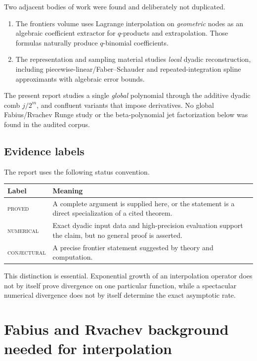 \documentclass[11pt,oneside]{article}
\theoremstyle{definition}
\theoremstyle{remark}
\newcommand{\statusproved}{\textsc{proved}}
\newcommand{\statusnumeric}{\textsc{numerical}}
\newcommand{\statusconj}{\textsc{conjectural}}
\begin{document}
Two adjacent bodies of work were found and deliberately not duplicated.
\begin{enumerate}[leftmargin=2em]
\item The frontiers volume uses Lagrange interpolation on \emph{geometric} nodes as an algebraic coefficient extractor for $q$-products and extrapolation.  Those formulas naturally produce $q$-binomial coefficients.
\item The representation and sampling material studies \emph{local} dyadic reconstruction, including piecewise-linear/Faber--Schauder and repeated-integration spline approximants with algebraic error bounds.
\end{enumerate}
The present report studies a single \emph{global} polynomial through the additive dyadic comb $j/2^m$, and confluent variants that impose derivatives.  No global Fabius/Rvachev Runge study or the beta-polynomial jet factorization below was found in the audited corpus.

\subsection{Evidence labels}

The report uses the following status convention.
\begin{center}
\begin{tabularx}{0.93\textwidth}{@{}p{}X@{}}
\toprule
Label & Meaning \\
\midrule
\statusproved & A complete argument is supplied here, or the statement is a direct specialization of a cited theorem. \\
\statusnumeric & Exact dyadic input data and high-precision evaluation support the claim, but no general proof is asserted. \\
\statusconj & A precise frontier statement suggested by theory and computation. \\
\bottomrule
\end{tabularx}
\end{center}
This distinction is essential.  Exponential growth of an interpolation operator does not by itself prove divergence on one particular function, while a spectacular numerical divergence does not by itself determine the exact asymptotic rate.

\section{Fabius and Rvachev background needed for interpolation}
\label{sec:background}
\end{document}

